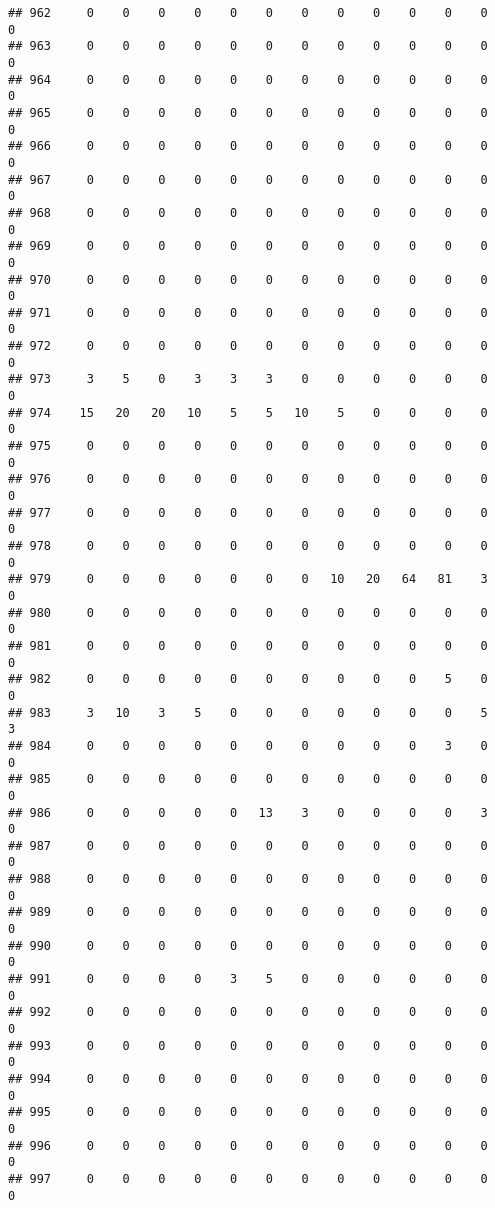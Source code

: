 \documentclass[]{article}
\begin{document}
\begin{verbatim}
## 962     0    0    0    0    0    0    0    0    0    0    0    0    0
## 963     0    0    0    0    0    0    0    0    0    0    0    0    0
## 964     0    0    0    0    0    0    0    0    0    0    0    0    0
## 965     0    0    0    0    0    0    0    0    0    0    0    0    0
## 966     0    0    0    0    0    0    0    0    0    0    0    0    0
## 967     0    0    0    0    0    0    0    0    0    0    0    0    0
## 968     0    0    0    0    0    0    0    0    0    0    0    0    0
## 969     0    0    0    0    0    0    0    0    0    0    0    0    0
## 970     0    0    0    0    0    0    0    0    0    0    0    0    0
## 971     0    0    0    0    0    0    0    0    0    0    0    0    0
## 972     0    0    0    0    0    0    0    0    0    0    0    0    0
## 973     3    5    0    3    3    3    0    0    0    0    0    0    0
## 974    15   20   20   10    5    5   10    5    0    0    0    0    0
## 975     0    0    0    0    0    0    0    0    0    0    0    0    0
## 976     0    0    0    0    0    0    0    0    0    0    0    0    0
## 977     0    0    0    0    0    0    0    0    0    0    0    0    0
## 978     0    0    0    0    0    0    0    0    0    0    0    0    0
## 979     0    0    0    0    0    0    0   10   20   64   81    3    0
## 980     0    0    0    0    0    0    0    0    0    0    0    0    0
## 981     0    0    0    0    0    0    0    0    0    0    0    0    0
## 982     0    0    0    0    0    0    0    0    0    0    5    0    0
## 983     3   10    3    5    0    0    0    0    0    0    0    5    3
## 984     0    0    0    0    0    0    0    0    0    0    3    0    0
## 985     0    0    0    0    0    0    0    0    0    0    0    0    0
## 986     0    0    0    0    0   13    3    0    0    0    0    3    0
## 987     0    0    0    0    0    0    0    0    0    0    0    0    0
## 988     0    0    0    0    0    0    0    0    0    0    0    0    0
## 989     0    0    0    0    0    0    0    0    0    0    0    0    0
## 990     0    0    0    0    0    0    0    0    0    0    0    0    0
## 991     0    0    0    0    3    5    0    0    0    0    0    0    0
## 992     0    0    0    0    0    0    0    0    0    0    0    0    0
## 993     0    0    0    0    0    0    0    0    0    0    0    0    0
## 994     0    0    0    0    0    0    0    0    0    0    0    0    0
## 995     0    0    0    0    0    0    0    0    0    0    0    0    0
## 996     0    0    0    0    0    0    0    0    0    0    0    0    0
## 997     0    0    0    0    0    0    0    0    0    0    0    0    0

\end{verbatim}
\end{document}
